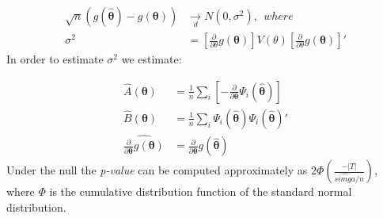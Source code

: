 \documentclass[]{article}
\begin{document}
$$
\begin{aligned}
	\sqrt{n}(g(\hat{\pmb{\theta}}) - g(\pmb{\theta})) &\underset{d}{\longrightarrow}N(0, \sigma^2),~~where\\
	  \sigma^2 &= \left[\frac{\partial}{\partial \theta}g(\pmb{\theta})\right]V(\theta)\left[\frac{\partial}{\partial \theta}g(\pmb{\theta})\right]'
\end{aligned}
$$
In order to estimate $\sigma^2$ we estimate:

$$
\begin{aligned}
	\hat{A}(\pmb{\theta}) &= \frac{1}{n}\sum_{i}\left[-\frac{\partial}{\partial\pmb{\theta}}\Psi_i(\hat{\pmb{\theta}})\right]\\
	\hat{B}(\pmb{\theta}) &= \frac{1}{n}\sum_{i}\Psi_i(\hat{\pmb{\theta}})\Psi_i(\hat{\pmb{\theta}})'\\
	\widehat{\frac{\partial}{\partial\pmb{\theta}}g(\pmb{\theta})} &= \frac{\partial}{\partial\pmb{\theta}}g(\hat{\pmb{\theta}})
\end{aligned}
$$
Under the null the \emph{p-value} can be computed approximately as $2\Phi\left(\frac{-|T|}{\hat{simga}/n}\right)$, where $\Phi$ is the cumulative distribution function of the standard normal distribution.
\end{document}
